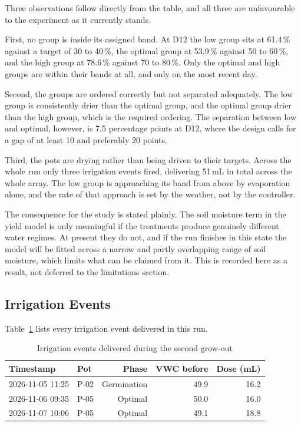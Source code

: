Three observations follow directly from the table, and all three are
unfavourable to the experiment as it currently stands.

First, no group is inside its assigned band. At D12 the low group sits at
61.4\,\% against a target of 30 to 40\,\%, the optimal group at 53.9\,\%
against 50 to 60\,\%, and the high group at 78.6\,\% against 70 to 80\,\%.
Only the optimal and high groups are within their bands at all, and only on
the most recent day.

Second, the groups are ordered correctly but not separated adequately. The
low group is consistently drier than the optimal group, and the optimal group
drier than the high group, which is the required ordering. The separation
between low and optimal, however, is 7.5 percentage points at D12, where the
design calls for a gap of at least 10 and preferably 20 points.

Third, the pots are drying rather than being driven to their targets. Across the
whole run only three irrigation events fired, delivering 51\,mL in total
across the whole array. The low group is approaching its band from above by
evaporation alone, and the rate of that approach is set by the weather, not by
the controller.

The consequence for the study is stated plainly. The soil moisture term in the
yield model is only meaningful if the treatments produce genuinely different
water regimes. At present they do not, and if the run finishes in this state
the model will be fitted across a narrow and partly overlapping range of soil
moisture, which limits what can be claimed from it. This is recorded here as a
result, not deferred to the limitations section.

\subsection{Irrigation Events}

Table~\ref{tab:irrigation} lists every irrigation event delivered in this run.

\begin{table}[ht]
\centering
\caption{Irrigation events delivered during the second grow-out}
\label{tab:irrigation}
\begin{tabular}{llrrr}
\toprule
\textbf{Timestamp} & \textbf{Pot} & \textbf{Phase} & \textbf{VWC before} & \textbf{Dose (mL)} \\
\midrule
2026-11-05 11:25 & P-02 & Germination & 49.9 & 16.2 \\
2026-11-06 09:35 & P-05 & Optimal     & 50.0 & 16.0 \\
2026-11-07 10:06 & P-05 & Optimal     & 49.1 & 18.8 \\
\bottomrule
\end{tabular}
\end{table}

